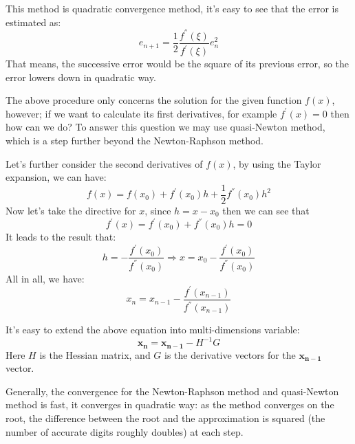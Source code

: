 This method is quadratic convergence method, it's easy to see that the error is estimated
as:
\begin{equation}
 \label{newton_raphson_error}
 e_{n+1} = \frac{1}{2}\frac{f^{''}(\xi)}{f^{'}(\xi)}e_{n}^{2}
\end{equation}
That means, the successive error would be the square of its previous error, so the error
lowers down in quadratic way.

The above procedure only concerns the solution for the given function $f(x)$, however; if 
we want to calculate its first derivatives, for example $f^{'}(x) = 0$ then how can we do?
To answer this question we may use quasi-Newton method, which is a step further beyond the 
Newton-Raphson method.

Let's further consider the second derivatives of $f(x)$, by using the Taylor expansion, 
we can have:
\begin{equation}
 \label{Newton-Raphson_eq:5}
 f(x) = f(x_{0}) + f^{'}(x_{0})h + \frac{1}{2}f^{''}(x_{0})h^{2}
\end{equation}
Now let's take the directive for $x$, since $h = x - x_{0}$ then we can see that 
\begin{equation}
 \label{Newton-Raphson_eq:6}
 f^{'}(x) = f^{'}(x_{0}) + f^{''}(x_{0})h = 0
\end{equation}
It leads to the result that:
\begin{equation}
\label{Newton-Raphson_eq:7}
 h = -\frac{f^{'}(x_{0})}{f^{''}(x_{0})} \Rightarrow x = x_{0} - \frac{f^{'}(x_{0})}{f^{''}(x_{0})}
\end{equation}
All in all, we have:
\begin{equation}
\label{Newton-Raphson_eq:8}
 x_{n} = x_{n-1} - \frac{f^{'}(x_{n-1})}{f^{''}(x_{n-1})}
\end{equation}

It's easy to extend the above equation into multi-dimensions variable:
\begin{equation}
\label{Newton-Raphson_eq:9}
 \mathbf{x_{n}} = \mathbf{x_{n-1}} - H^{-1}G
\end{equation}
Here $H$ is the Hessian matrix, and $G$ is the derivative vectors for the $\mathbf{x_{n-1}}$
vector.

Generally, the convergence for the Newton-Raphson method and quasi-Newton method is fast, 
it converges in quadratic way: as the method converges on the root, the difference between 
the root and the approximation is squared (the number of accurate digits roughly doubles) 
at each step.

